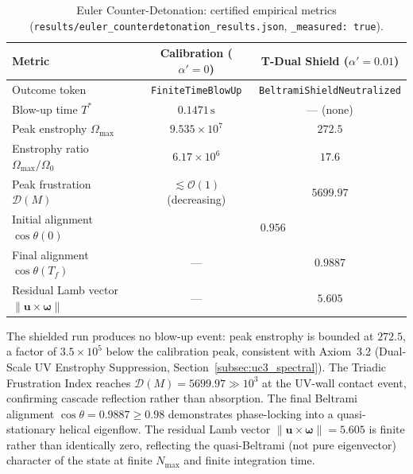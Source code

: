 \begin{table}[H]
  \centering
  \caption{%
    Euler Counter-Detonation: certified empirical metrics
    (\texttt{results/euler\_counterdetonation\_results.json},
    \texttt{\_measured: true}).%
  }
  \label{tab:euler_counterdetonation}
  \renewcommand{\arraystretch}{1.2}
  \begin{tabular}{@{}lcc@{}}
    \toprule
    \textbf{Metric}
      & \textbf{Calibration ($\alpha'=0$)}
      & \textbf{T-Dual Shield ($\alpha'=0.01$)} \\
    \midrule
    Outcome token
      & \texttt{FiniteTimeBlowUp}
      & \texttt{BeltramiShieldNeutralized} \\
    Blow-up time $T^*$
      & $0.1471\,\text{s}$
      & --- (none) \\
    Peak enstrophy $\Omega_{\max}$
      & $9.535 \times 10^7$
      & $272.5$ \\
    Enstrophy ratio $\Omega_{\max}/\Omega_0$
      & $6.17 \times 10^6$
      & $17.6$ \\
    Peak frustration $\mathcal{D}(M)$
      & $\lesssim\!\mathcal{O}(1)$ (decreasing)
      & $\mathbf{5699.97}$ \\
    Initial alignment $\cos\theta(0)$
      & \multicolumn{2}{c}{$0.956$} \\
    Final alignment $\cos\theta(T_f)$
      & ---
      & $0.9887$ \\
    Residual Lamb vector $\|\mathbf{u}\times\boldsymbol{\omega}\|$
      & ---
      & $5.605$ \\
    \bottomrule
  \end{tabular}
\end{table}

The shielded run produces no blow-up event: peak enstrophy is bounded at $272.5$,
a factor of $3.5 \times 10^5$ below the calibration peak, consistent with
Axiom~3.2 (Dual-Scale UV Enstrophy Suppression, Section~\ref{subsec:uc3_spectral}).
The Triadic Frustration Index reaches $\mathcal{D}(M) = 5699.97 \gg 10^3$ at the
UV-wall contact event, confirming cascade reflection rather than absorption.
The final Beltrami alignment $\cos\theta = 0.9887 \ge 0.98$ demonstrates
phase-locking into a quasi-stationary helical eigenflow.
The residual Lamb vector $\|\mathbf{u}\times\boldsymbol{\omega}\| = 5.605$
is finite rather than identically zero, reflecting the quasi-Beltrami
(not pure eigenvector) character of the state at finite $N_{\max}$ and finite
integration time.

